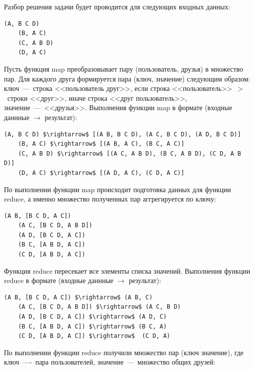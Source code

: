 \documentclass[12pt,a4paper,oneside]{extarticle}
\begin{document}
            Разбор решения задачи будет проводится для следующих входных данных: 
            \lstset{} %
            \begin{lstlisting}[mathescape] 
    (A, B C D)
    (B, A C)
    (C, A B D)
    (D, A C)
            \end{lstlisting}

            Пусть функция map преобразовывает пару (пользователь, друзья) в множество пар.
            Для каждого друга формируется пара (ключ, значение) следующим образом: ключ~---~строка <<пользователь друг>>, если строка <<пользователь>>~$>$~строки <<друг>>, иначе строка <<друг пользователь>>, значение~---~<<друзья>>. Выполнения функции map в формате (входные даннные $\rightarrow$ результат):

            \lstset{}
            \begin{lstlisting}[mathescape] 
    (A, B C D) $\rightarrow$ [(A B, B C D), (A C, B C D), (A D, B C D)]
    (B, A C) $\rightarrow$ [(A B, A C), (B C, A C)]
    (C, A B D) $\rightarrow$ [(A C, A B D), (B C, A B D), (C D, A B D)]
    (D, A C) $\rightarrow$ [(A D, A C), (C D, A C)]
            \end{lstlisting}
                
            По выполнении функции map происходит подготовка данных для функции reduce, а именно множество полученных пар аггрегируется по ключу:

            \lstset{}
            \begin{lstlisting}[mathescape] 
    (A B, [B C D, A C])
    (A C, [B C D, A B D])
    (A D, [B C D, A C])
    (B C, [A B D, A C])
    (C D, [A B D, A C])
            \end{lstlisting}

            Функция reduce пересекает все элементы списка значений. Выполнения функции reduce в формате (входные даннные $\rightarrow$ результат):

            \lstset{}
            \begin{lstlisting}[mathescape] 
    (A B, [B C D, A C]) $\rightarrow$ (A B, C)
    (A C, [B C D, A B D]) $\rightarrow$ (A C, B D)
    (A D, [B C D, A C]) $\rightarrow$ (A D, C)
    (B C, [A B D, A C]) $\rightarrow$ (B C, A)
    (C D, [A B D, A C]) $\rightarrow$  (C D, A)
            \end{lstlisting}


        По выполнении функции reduce получили множество пар (ключ значение), где ключ~----~пара пользователей, значение~---~множество общих друзей:
\end{document}
